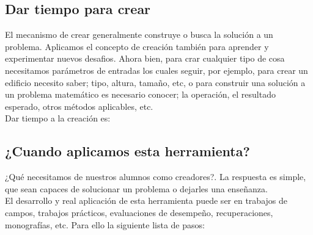 \subsection{Dar tiempo para crear}
El mecanismo de crear generalmente construye o busca la soluci\'on a un problema. Aplicamos el concepto de creaci\'on tambi\'en para aprender y experimentar 
nuevos desafios. Ahora bien, para crar cualquier tipo de cosa necesitamos par\'ametros de entradas los cuales seguir, por ejemplo, para crear un edificio 
necesito saber; tipo, altura, tama\~no, etc, o para construir una soluci\'on a un problema matem\'atico es necesario conocer; la operaci\'on, el resultado 
esperado, otros m\'etodos aplicables, etc. \\
Dar tiempo a la creaci\'on es: 
\subsection{¿Cuando aplicamos esta herramienta?}
¿Qu\'e necesitamos de nuestros alumnos como creadores?. La respuesta es simple, que sean capaces de solucionar un problema o dejarles una ense\~nanza.\\
El desarrollo y real aplicaci\'on de esta herramienta puede ser en trabajos de campos, trabajos pr\'acticos, evaluaciones de desempe\~no, recuperaciones, 
monograf\'ias, etc. Para ello la siguiente lista de pasos:\\
